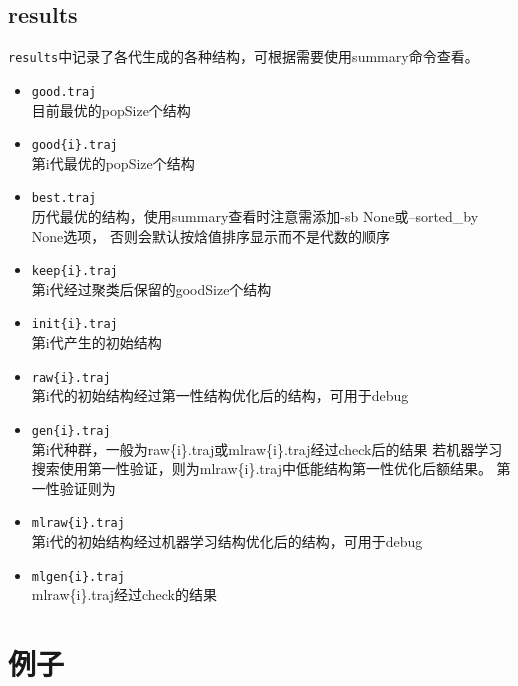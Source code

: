 \documentclass[12pt]{article}
\newcommand{\file}[1]{\texttt{#1}}
\begin{document}
\subsection{results}
\file{results}中记录了各代生成的各种结构，可根据需要使用summary命令查看。
\begin{itemize}
    \item \file{good.traj}\\
    目前最优的popSize个结构
    \item \file{good\{i\}.traj}\\
    第i代最优的popSize个结构
    \item \file{best.traj}\\
    历代最优的结构，使用summary查看时注意需添加-sb None或--sorted\_by None选项，
    否则会默认按焓值排序显示而不是代数的顺序
    \item \file{keep\{i\}.traj}\\
    第i代经过聚类后保留的goodSize个结构
    \item \file{init\{i\}.traj}\\
    第i代产生的初始结构
    \item \file{raw\{i\}.traj}\\
    第i代的初始结构经过第一性结构优化后的结构，可用于debug
    \item \file{gen\{i\}.traj}\\
    第i代种群，一般为raw\{i\}.traj或mlraw\{i\}.traj经过check后的结果
    若机器学习搜索使用第一性验证，则为mlraw\{i\}.traj中低能结构第一性优化后额结果。
    第一性验证则为
    \item \file{mlraw\{i\}.traj}\\
    第i代的初始结构经过机器学习结构优化后的结构，可用于debug
    \item \file{mlgen\{i\}.traj}\\
    mlraw\{i\}.traj经过check的结果
\end{itemize}
\newpage
\section{例子}
\end{document}
